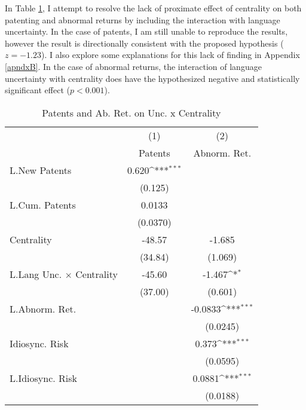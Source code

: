 In Table \ref{r7}, I attempt to resolve the lack of proximate effect of centrality on both patenting and abnormal returns by including the interaction with language uncertainty. In the case of patents, I am still unable to reproduce the results, however the result is directionally consistent with the proposed hypothesis ($z=-1.23$). I also explore some explanations for this lack of finding in Appendix \ref{apndxB}. In the case of abnormal returns, the interaction of language uncertainty with centrality does have the hypothesized negative and statistically significant effect ($p<0.001$).

\begin{table}[htbp]\centering \caption[Regression of Patents and Ab. Ret. on Unc. x Centrality]{Patents and Ab. Ret. on Unc. x Centrality\label{r7}}
{
\def\sym#1{\ifmmode^{#1}\else\(^{#1}\)\fi}
\begin{tabular}{l*{2}{c}}
\hline\hline
                    &\multicolumn{1}{c}{(1)}&\multicolumn{1}{c}{(2)}\\
                    &\multicolumn{1}{c}{Patents}&\multicolumn{1}{c}{Abnorm. Ret.}\\
\hline
L.New Patents       &       0.620\sym{***}&                     \\
                    &     (0.125)         &                     \\
L.Cum. Patents      &      0.0133         &                     \\
                    &    (0.0370)         &                     \\
Centrality          &      -48.57         &      -1.685         \\
                    &     (34.84)         &     (1.069)         \\
L.Lang Unc. $\times$ Centrality&      -45.60         &      -1.467\sym{*}  \\
                    &     (37.00)         &     (0.601)         \\
L.Abnorm. Ret.      &                     &     -0.0833\sym{***}\\
                    &                     &    (0.0245)         \\
Idiosync. Risk      &                     &       0.373\sym{***}\\
                    &                     &    (0.0595)         \\
L.Idiosync. Risk    &                     &      0.0881\sym{***}\\
                    &                     &    (0.0188)         \\

\end{tabular}}
\end{table}
